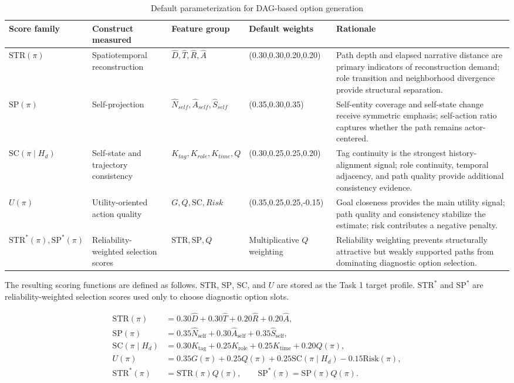 \documentclass[pdflatex,sn-mathphys-num]{sn-jnl}%
\theoremstyle{thmstyleone}%
\theoremstyle{thmstyletwo}%
\theoremstyle{thmstylethree}%
\begin{document}
\begin{table}[htbp]
\centering
\small
\caption{Default parameterization for DAG-based option generation}
\label{tab:default-parameterization-for-dag-based-o}
\begin{tabular}{p{}p{}p{}p{}p{}}
\toprule
Score family & Construct measured & Feature group & Default weights & Rationale \\
\midrule
$\mathrm{STR}(\pi)$ & Spatiotemporal reconstruction & $\hat{D},\hat{T},\hat{R},\hat{A}$ & (0.30,0.30,0.20,0.20) & Path depth and elapsed narrative distance are primary indicators of reconstruction demand; role transition and neighborhood divergence provide structural separation. \\
$\mathrm{SP}(\pi)$ & Self-projection & $\hat{N}_{self},\hat{A}_{self},\hat{S}_{self}$ & (0.35,0.30,0.35) & Self-entity coverage and self-state change receive symmetric emphasis; self-action ratio captures whether the path remains actor-centered. \\
$\mathrm{SC}(\pi\mid H_d)$ & Self-state and trajectory consistency & $K_{tag},K_{role},K_{time},Q$ & (0.30,0.25,0.25,0.20) & Tag continuity is the strongest history-alignment signal; role continuity, temporal adjacency, and path quality provide additional consistency evidence. \\
$U(\pi)$ & Utility-oriented action quality & $G,Q,\mathrm{SC},Risk$ & (0.35,0.25,0.25,-0.15) & Goal closeness provides the main utility signal; path quality and consistency stabilize the estimate; risk contributes a negative penalty. \\
$\mathrm{STR}^{*}(\pi),\mathrm{SP}^{*}(\pi)$ & Reliability-weighted selection scores & $\mathrm{STR},\mathrm{SP},Q$ & Multiplicative $Q$ weighting & Reliability weighting prevents structurally attractive but weakly supported paths from dominating diagnostic option selection. \\
\bottomrule
\end{tabular}
\end{table}

The resulting scoring functions are defined as follows. $\mathrm{STR}$, $\mathrm{SP}$, $\mathrm{SC}$, and $U$ are stored as the Task 1 target profile. $\mathrm{STR}^{*}$ and $\mathrm{SP}^{*}$ are reliability-weighted selection scores used only to choose diagnostic option slots.

\begin{align}
\mathrm{STR}(\pi)&=0.30\widehat{D}+0.30\widehat{T}+0.20\widehat{R}+0.20\widehat{A},\\
\mathrm{SP}(\pi)&=0.35\widehat{N}_{\mathrm{self}}+0.30\widehat{A}_{\mathrm{self}}+0.35\widehat{S}_{\mathrm{self}},\\
\mathrm{SC}(\pi\mid H_d)&=0.30K_{\mathrm{tag}}+0.25K_{\mathrm{role}}+0.25K_{\mathrm{time}}+0.20Q(\pi),\\
U(\pi)&=0.35G(\pi)+0.25Q(\pi)+0.25\mathrm{SC}(\pi\mid H_d)-0.15\mathrm{Risk}(\pi),\\
\mathrm{STR}^{*}(\pi)&=\mathrm{STR}(\pi)Q(\pi),\qquad
\mathrm{SP}^{*}(\pi)=\mathrm{SP}(\pi)Q(\pi).
\end{align}
\end{document}
